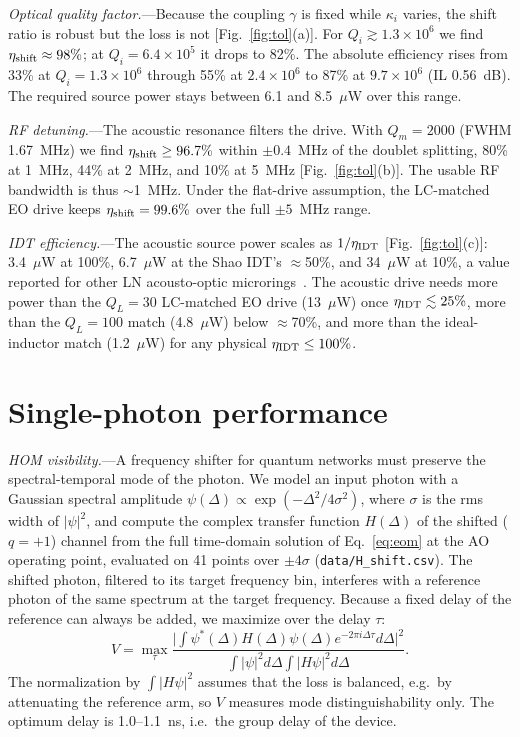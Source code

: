 \documentclass[aps,prapplied,reprint,superscriptaddress,amsmath,amssymb,floatfix]{revtex4-2}
\newcommand{\etash}{\eta_{\rm shift}}
\begin{document}
\emph{Optical quality factor.}---Because the coupling $\gamma$ is fixed while $\kappa_i$ varies, the shift ratio is robust but the loss is not [Fig.~\ref{fig:tol}(a)]. For $Q_i\gtrsim1.3\times10^6$ we find $\etash\approx98\%$; at $Q_i=6.4\times10^5$ it drops to 82\%. The absolute efficiency rises from 33\% at $Q_i=1.3\times10^6$ through 55\% at $2.4\times10^6$ to 87\% at $9.7\times10^6$ (IL 0.56~dB). The required source power stays between 6.1 and 8.5~$\mu$W over this range.

\emph{RF detuning.}---The acoustic resonance filters the drive. With $Q_m=2000$ (FWHM 1.67~MHz) we find $\etash\ge96.7\%$ within $\pm0.4$~MHz of the doublet splitting, 80\% at 1~MHz, 44\% at 2~MHz, and 10\% at 5~MHz [Fig.~\ref{fig:tol}(b)]. The usable RF bandwidth is thus $\sim$1~MHz. Under the flat-drive assumption, the LC-matched EO drive keeps $\etash=99.6\%$ over the full $\pm5$~MHz range.

\emph{IDT efficiency.}---The acoustic source power scales as $1/\eta_{\rm IDT}$ [Fig.~\ref{fig:tol}(c)]: 3.4~$\mu$W at 100\%, 6.7~$\mu$W at the Shao IDT's $\approx$50\%, and 34~$\mu$W at 10\%, a value reported for other LN acousto-optic microrings~\cite{Xu2025b}. The acoustic drive needs more power than the $Q_L=30$ LC-matched EO drive (13~$\mu$W) once $\eta_{\rm IDT}\lesssim25\%$, more than the $Q_L=100$ match (4.8~$\mu$W) below $\approx$70\%, and more than the ideal-inductor match (1.2~$\mu$W) for any physical $\eta_{\rm IDT}\le100\%$.

\section{Single-photon performance}\label{sec:quantum}
\emph{HOM visibility.}---A frequency shifter for quantum networks must preserve the spectral-temporal mode of the photon. We model an input photon with a Gaussian spectral amplitude $\psi(\Delta)\propto\exp(-\Delta^2/4\sigma^2)$, where $\sigma$ is the rms width of $|\psi|^2$, and compute the complex transfer function $H(\Delta)$ of the shifted ($q=+1$) channel from the full time-domain solution of Eq.~\eqref{eq:eom} at the AO operating point, evaluated on 41 points over $\pm4\sigma$ (\texttt{data/H\_shift.csv}). The shifted photon, filtered to its target frequency bin, interferes with a reference photon of the same spectrum at the target frequency. Because a fixed delay of the reference can always be added, we maximize over the delay $\tau$:
\begin{equation}
V=\max_\tau\frac{\big|\int\psi^*(\Delta)H(\Delta)\psi(\Delta)e^{-2\pi i\Delta\tau}d\Delta\big|^2}{\int|\psi|^2d\Delta\int|H\psi|^2d\Delta}.
\label{eq:hom}
\end{equation}
The normalization by $\int|H\psi|^2$ assumes that the loss is balanced, e.g.\ by attenuating the reference arm, so $V$ measures mode distinguishability only. The optimum delay is 1.0--1.1~ns, i.e.\ the group delay of the device.
\end{document}
